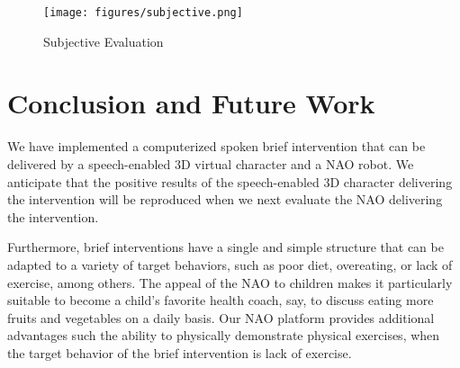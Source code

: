 \documentclass[letterpaper]{article}
\begin{document}
 \begin{figure}
 \centering
 \texttt{[image: figures/subjective.png]}
 \caption{Subjective Evaluation}
 \label{yesNoEva}
 \end{figure}
 

\section*{Conclusion and Future Work} 

We have implemented a computerized spoken brief intervention that can be delivered by a speech-enabled 3D virtual character and a NAO robot.  We anticipate that the positive results of the speech-enabled 3D character delivering the intervention will be reproduced when we next evaluate the NAO delivering the intervention.

Furthermore, brief interventions have a single and simple structure that can be adapted to a variety of target behaviors, such as poor diet, overeating, or lack of exercise, among others.
The appeal of the NAO to children 
\cite{belpaeme2012multimodal} makes it particularly suitable to become a child's favorite health 
coach, say, to discuss eating more fruits and vegetables on a daily basis. Our NAO platform 
provides additional advantages such the ability to physically demonstrate physical exercises, when the target behavior of the brief intervention is lack of exercise.

       
   
\end{document}
